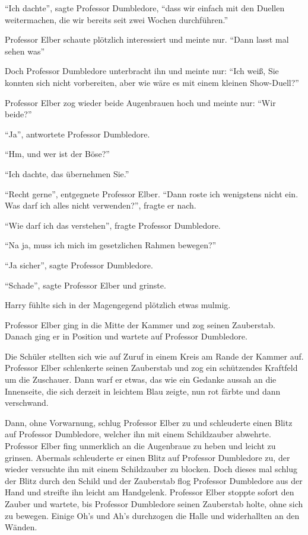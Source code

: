 \enquote{Ich dachte}, sagte Professor Dumbledore, \enquote{dass wir einfach mit den Duellen weitermachen, die wir bereits seit zwei Wochen durchführen.}

Professor Elber schaute plötzlich interessiert und meinte nur. \enquote{Dann lasst mal sehen was\abs}

Doch Professor Dumbledore unterbracht ihn und meinte nur: \enquote{Ich weiß, Sie konnten sich nicht vorbereiten, aber wie wäre es mit einem kleinen Show-Duell?}

Professor Elber zog wieder beide Augenbrauen hoch und meinte nur: \enquote{Wir beide?}

\enquote{Ja}, antwortete Professor Dumbledore.

\enquote{Hm, und wer ist der Böse?}

\enquote{Ich dachte, das übernehmen Sie.}

\enquote{Recht gerne}, entgegnete Professor Elber. \enquote{Dann roste ich wenigstens nicht ein. Was darf ich alles nicht verwenden?}, fragte er nach.

\enquote{Wie darf ich das verstehen}, fragte Professor Dumbledore.

\enquote{Na ja, muss ich mich im gesetzlichen Rahmen bewegen?}

\enquote{Ja sicher}, sagte Professor Dumbledore.

\enquote{Schade}, sagte Professor Elber und grinste.

Harry fühlte sich in der Magengegend plötzlich etwas mulmig. 

Professor Elber ging in die Mitte der Kammer und zog seinen Zauberstab. Danach ging er in Position und wartete auf Professor Dumbledore.

Die Schüler stellten sich wie auf Zuruf in einem Kreis am Rande der Kammer auf. Professor Elber schlenkerte seinen Zauberstab und zog ein schützendes Kraftfeld um die Zuschauer. Dann warf er etwas, das wie ein Gedanke aussah an die Innenseite, die sich derzeit in leichtem Blau zeigte, nun rot färbte und dann verschwand.

Dann, ohne Vorwarnung, schlug Professor Elber zu und schleuderte einen Blitz auf Professor Dumbledore, welcher ihn mit einem Schildzauber abwehrte. Professor Elber fing unmerklich an die Augenbraue zu heben und leicht zu grinsen. Abermals schleuderte er einen Blitz auf Professor Dumbledore zu, der wieder versuchte ihn mit einem Schildzauber zu blocken. Doch dieses mal schlug der Blitz durch den Schild und der Zauberstab flog Professor Dumbledore aus der Hand und streifte ihn leicht am Handgelenk. Professor Elber stoppte sofort den Zauber und wartete, bis Professor Dumbledore seinen Zauberstab holte, ohne sich zu bewegen. Einige Oh's und Ah's durchzogen die Halle und widerhallten an den Wänden.

